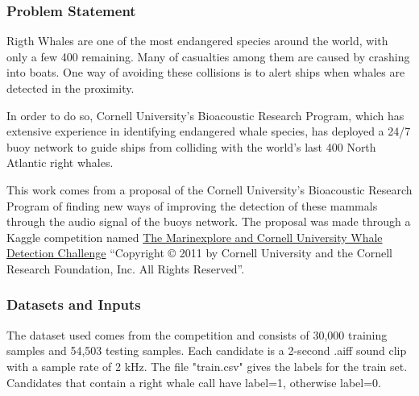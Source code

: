 \documentclass[]{article}
\newcommand{\competition}{The Marinexplore and Cornell University Whale Detection Challenge}
\newcommand{\copyrighting}{“Copyright © 2011 by Cornell University and the Cornell Research Foundation, Inc. All Rights Reserved”}
\begin{document}
\subsubsection{Problem Statement}\label{problem-statement}

Rigth Whales are one of the most endangered species around the world, with only a few 400 remaining. Many of casualties among them are caused by crashing into boats. One way of avoiding these collisions is to alert ships when whales are detected in the proximity.

In order to do so, Cornell University's Bioacoustic Research Program, which has extensive experience in identifying endangered whale species, has deployed a 24/7 buoy network to guide ships from colliding with the world's last 400 North Atlantic right whales.

This work comes from a proposal of the Cornell University's Bioacoustic Research Program of finding new ways of improving the detection of these mammals through the audio signal of the buoys network. The proposal was made through a Kaggle competition named \href{https://www.kaggle.com/c/whale-detection-challenge}{\competition} \cite{kagglewhale} \copyrighting.

\subsubsection{Datasets and Inputs}\label{datasets-and-inputs}

The dataset used comes from the competition and consists of 30,000 training samples and 54,503 testing samples. Each candidate is a 2-second .aiff sound clip with a sample rate of 2 kHz. The file "train.csv" gives the labels for the train set. Candidates that contain a right whale call have label=1, otherwise label=0.
\end{document}
